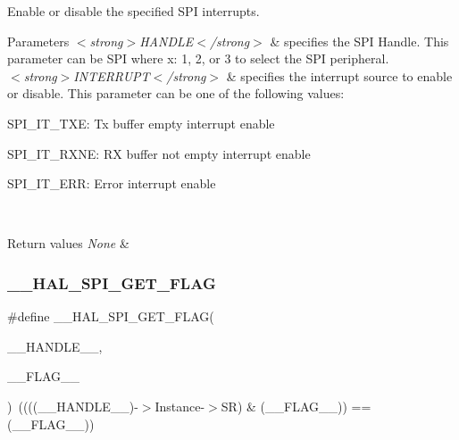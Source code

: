 Enable or disable the specified S\+PI interrupts. 


\begin{DoxyParams}{Parameters}
{\em $<$strong$>$\+H\+A\+N\+D\+L\+E$<$/strong$>$} & specifies the S\+PI Handle. This parameter can be S\+PI where x\+: 1, 2, or 3 to select the S\+PI peripheral. \\
\hline
{\em $<$strong$>$\+I\+N\+T\+E\+R\+R\+U\+P\+T$<$/strong$>$} & specifies the interrupt source to enable or disable. This parameter can be one of the following values\+: \begin{DoxyItemize}
\item S\+P\+I\+\_\+\+I\+T\+\_\+\+T\+XE\+: Tx buffer empty interrupt enable \item S\+P\+I\+\_\+\+I\+T\+\_\+\+R\+X\+NE\+: RX buffer not empty interrupt enable \item S\+P\+I\+\_\+\+I\+T\+\_\+\+E\+RR\+: Error interrupt enable \end{DoxyItemize}
\\
\hline
\end{DoxyParams}

\begin{DoxyRetVals}{Return values}
{\em None} & \\
\hline
\end{DoxyRetVals}
\mbox{\label{group___s_p_i___exported___macros_gaa0bbe5fb55f93fd277ddb6acf58cec53}} 
\subsubsection{\texorpdfstring{\+\_\+\+\_\+\+H\+A\+L\+\_\+\+S\+P\+I\+\_\+\+G\+E\+T\+\_\+\+F\+L\+AG}{\_\_HAL\_SPI\_GET\_FLAG}}
{\footnotesize\ttfamily \#define \+\_\+\+\_\+\+H\+A\+L\+\_\+\+S\+P\+I\+\_\+\+G\+E\+T\+\_\+\+F\+L\+AG(\begin{DoxyParamCaption}\item[{}]{\+\_\+\+\_\+\+H\+A\+N\+D\+L\+E\+\_\+\+\_\+,  }\item[{}]{\+\_\+\+\_\+\+F\+L\+A\+G\+\_\+\+\_\+ }\end{DoxyParamCaption})~((((\+\_\+\+\_\+\+H\+A\+N\+D\+L\+E\+\_\+\+\_\+)-\/$>$Instance-\/$>$SR) \& (\+\_\+\+\_\+\+F\+L\+A\+G\+\_\+\+\_\+)) == (\+\_\+\+\_\+\+F\+L\+A\+G\+\_\+\+\_\+))}



